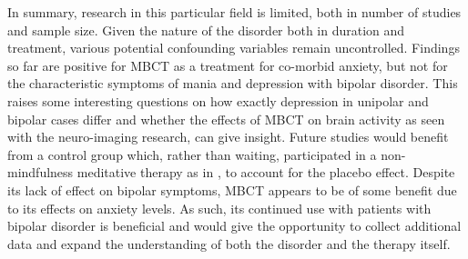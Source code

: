 In summary, research in this particular field is limited, both in number of studies and sample size. Given the nature of the disorder both in duration and treatment, various potential confounding variables remain uncontrolled. Findings so far are positive for MBCT as a treatment for co-morbid anxiety, but not for the characteristic symptoms of mania and depression with bipolar disorder. This raises some interesting questions on how exactly depression in unipolar and bipolar cases differ and whether the effects of MBCT on brain activity as seen with the neuro-imaging research, can give insight. Future studies would benefit from a control group which, rather than waiting, participated in a non-mindfulness meditative therapy as in \citet{jain_randomized_2007}, to account for the placebo effect. Despite its lack of effect on bipolar symptoms, MBCT appears to be of some benefit due to its effects on anxiety levels. As such, its continued use with patients with bipolar disorder is beneficial and would give the opportunity to collect additional data and expand the understanding of both the disorder and the therapy itself.
  
  